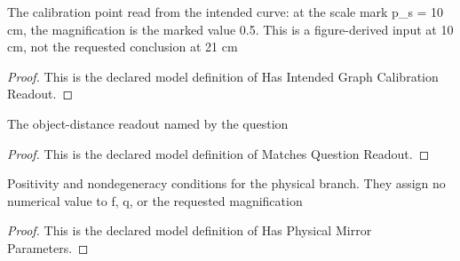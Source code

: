 \begin{definition}
  \label{def:physics:phyx-mini-0478:phyxminiproblems-problemphyxmini0478-hasintendedgraphcalibrationreadout}
  The calibration point read from the intended curve: at the scale mark p\_s = 10 cm, the magnification is the marked value 0.5. This is a figure-derived input at 10 cm, not the requested conclusion at 21 cm
\end{definition}
\begin{proof}
  This is the declared model definition of Has Intended Graph Calibration Readout.
\end{proof}
\begin{definition}
  \label{def:physics:phyx-mini-0478:phyxminiproblems-problemphyxmini0478-matchesquestionreadout}
  The object-distance readout named by the question
\end{definition}
\begin{proof}
  This is the declared model definition of Matches Question Readout.
\end{proof}
\begin{definition}
  \label{def:physics:phyx-mini-0478:phyxminiproblems-problemphyxmini0478-hasphysicalmirrorparameters}
  Positivity and nondegeneracy conditions for the physical branch. They assign no numerical value to f, q, or the requested magnification
\end{definition}
\begin{proof}
  This is the declared model definition of Has Physical Mirror Parameters.
\end{proof}
